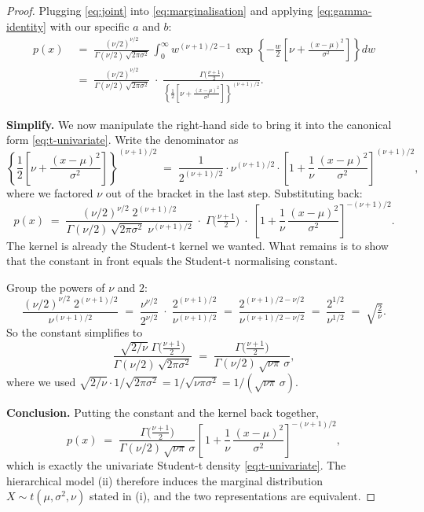 \documentclass[11pt, a4paper, oneside]{article}
\begin{document}
\begin{proof}
Plugging \eqref{eq:joint} into \eqref{eq:marginalisation} and applying
\eqref{eq:gamma-identity} with our specific $a$ and $b$:
\begin{align*}
p(x)
&\;=\; \frac{(\nu/2)^{\nu/2}}{\Gamma(\nu/2)\,\sqrt{2\pi\sigma^{2}}}\,
\int_0^{\infty} w^{(\nu+1)/2 - 1}\,
\exp\!\left\{-\frac{w}{2}\!\left[\nu + \tfrac{(x-\mu)^{2}}{\sigma^{2}}\right]\right\} dw \\[6pt]
&\;=\; \frac{(\nu/2)^{\nu/2}}{\Gamma(\nu/2)\,\sqrt{2\pi\sigma^{2}}}
\;\cdot\;
\frac{\Gamma\!\big(\tfrac{\nu+1}{2}\big)}
{\left\{\tfrac{1}{2}\!\left[\nu + \tfrac{(x-\mu)^{2}}{\sigma^{2}}\right]\right\}^{(\nu+1)/2}}.
\end{align*}

\medskip

\noindent\textbf{Simplify.}
We now manipulate the right-hand side to bring it into the canonical form
\eqref{eq:t-univariate}. Write the denominator as
\[
\left\{\frac{1}{2}\!\left[\nu + \frac{(x-\mu)^{2}}{\sigma^{2}}\right]\right\}^{(\nu+1)/2}
\;=\;
\frac{1}{2^{(\nu+1)/2}}
\cdot
\nu^{(\nu+1)/2}
\cdot
\left[1 + \frac{1}{\nu}\,\frac{(x-\mu)^{2}}{\sigma^{2}}\right]^{(\nu+1)/2},
\]
where we factored $\nu$ out of the bracket in the last step. Substituting
back:
\[
p(x) \;=\;
\frac{(\nu/2)^{\nu/2}\; 2^{(\nu+1)/2}}{\Gamma(\nu/2)\,\sqrt{2\pi\sigma^{2}}\; \nu^{(\nu+1)/2}}
\;\cdot\;
\Gamma\!\big(\tfrac{\nu+1}{2}\big)
\;\cdot\;
\left[1 + \frac{1}{\nu}\,\frac{(x-\mu)^{2}}{\sigma^{2}}\right]^{-(\nu+1)/2}.
\]
The kernel is already the Student-t kernel we wanted. What remains is to
show that the constant in front equals the Student-t normalising constant.

Group the powers of $\nu$ and $2$:
\[
\frac{(\nu/2)^{\nu/2}\; 2^{(\nu+1)/2}}{\nu^{(\nu+1)/2}}
\;=\;
\frac{\nu^{\nu/2}}{2^{\nu/2}}
\;\cdot\;
\frac{2^{(\nu+1)/2}}{\nu^{(\nu+1)/2}}
\;=\;
\frac{2^{(\nu+1)/2 - \nu/2}}{\nu^{(\nu+1)/2 - \nu/2}}
\;=\;
\frac{2^{1/2}}{\nu^{1/2}}
\;=\;
\sqrt{\tfrac{2}{\nu}}.
\]
So the constant simplifies to
\[
\frac{\sqrt{2/\nu}\;\Gamma\!\big(\tfrac{\nu+1}{2}\big)}{\Gamma(\nu/2)\,\sqrt{2\pi\sigma^{2}}}
\;=\;
\frac{\Gamma\!\big(\tfrac{\nu+1}{2}\big)}{\Gamma(\nu/2)\,\sqrt{\nu\pi}\,\sigma},
\]
where we used $\sqrt{2/\nu} \cdot 1/\sqrt{2\pi\sigma^{2}} = 1/\sqrt{\nu\pi\sigma^{2}}= 1/(\sqrt{\nu\pi}\,\sigma)$.

\medskip

\noindent\textbf{Conclusion.}
Putting the constant and the kernel back together,
\[
p(x) \;=\;
\frac{\Gamma\!\big(\tfrac{\nu+1}{2}\big)}{\Gamma(\nu/2)\,\sqrt{\nu\pi}\,\sigma}
\left[\,1 + \frac{1}{\nu}\,\frac{(x-\mu)^{2}}{\sigma^{2}}\right]^{-(\nu+1)/2},
\]
which is exactly the univariate Student-t density \eqref{eq:t-univariate}.
The hierarchical model (ii) therefore induces the marginal distribution
\mbox{$X \sim t(\mu, \sigma^{2}, \nu)$} stated in (i), and the two
representations are equivalent. \qedhere
\end{proof}
\end{document}
